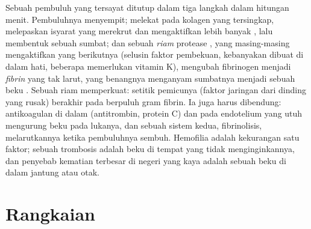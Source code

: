 \begin{proposition}[Hemostasis]\label{prop:b2:blood-circulation:clotting}
Sebuah pembuluh yang tersayat ditutup dalam tiga langkah dalam hitungan
menit. Pembuluhnya menyempit;  melekat pada kolagen yang
tersingkap, melepaskan isyarat yang merekrut dan mengaktifkan lebih
banyak , lalu membentuk sebuah sumbat; dan sebuah
\emph{riam} protease , yang masing-masing mengaktifkan yang
berikutnya (selusin faktor pembekuan, kebanyakan dibuat di dalam hati,
beberapa memerlukan vitamin K), mengubah fibrinogen menjadi
\emph{fibrin} yang tak larut, yang benangnya menganyam sumbatnya
menjadi sebuah beku . Sebuah riam memperkuat: setitik pemicunya
(faktor jaringan dari dinding yang rusak) berakhir pada berpuluh gram
fibrin. Ia juga harus dibendung: antikoagulan di dalam 
(antitrombin, protein C) dan pada endotelium yang utuh mengurung beku
 pada lukanya, dan sebuah sistem kedua, fibrinolisis,
melarutkannya ketika pembuluhnya sembuh. Hemofilia adalah kekurangan
satu faktor; sebuah trombosis adalah beku  di tempat yang tidak
menginginkannya, dan penyebab kematian terbesar di negeri yang kaya
adalah sebuah beku  di dalam  jantung atau otak.
\end{proposition}

\section{Rangkaian}

